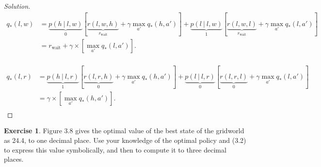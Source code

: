 \documentclass[oneside,11pt]{article}
\theoremstyle{definition}
\newtheorem{exer}[thm]{Exercise}
\newcommand{\qstar}{q_{\ast}}
\newcommand\givenbase[1][]{\:#1\lvert\:}
\let\given\givenbase
\newenvironment{solution}
{\renewcommand\qedsymbol{$\blacksquare$}\begin{proof}[Solution]} {\end{proof}}
\begin{document}
\begin{shaded}
\begin{solution}
\begin{equation*} %
\begin{split}
\qstar(l,w) & = \underbrace{p(h \given l,w)}_{ 0} \left [ \underbrace{r(l,w,h)}_{r_{\text{wait}}} + \gamma \max_{a'} \qstar(h,a')  \right ] + \underbrace{p(l \given l, w)}_{1} \left[ \underbrace{r(l,w,l)}_{r_{\text{wait}}} + \gamma \max_{a'} \qstar(l,a') \right ]\\
 & = r_{\text{wait}} + \gamma \times \left [  \max_{a'} \qstar(l,a') \right ]. \\
\end{split}
\end{equation*}

\begin{equation*} %
\begin{split}
\qstar(l,r) & = \underbrace{p(h \given l,r)}_{ 1} \left [ \underbrace{r(l,r,h)}_{0} + \gamma \max_{a'} \qstar(h,a')  \right ] + \underbrace{p(l \given l,r)}_{0} \left[ \underbrace{r(l,r,l)}_{0} + \gamma \max_{a'} \qstar(l,a') \right ]\\
 & =  \gamma \times \left [  \max_{a'} \qstar(h,a') \right ]. \\
\end{split}
\end{equation*}
\end{solution} 
\end{shaded}




\begin{exer}
Figure 3.8 gives the optimal value of the best state of the gridworld as 24.4, to one decimal place. Use your knowledge of the optimal policy and (3.2) to express this value symbolically, and then to compute it to three decimal places.
\end{exer}
\end{document}

